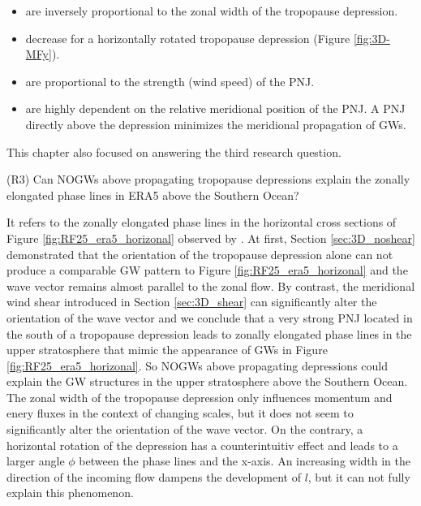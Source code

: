\begin{itemize}
    \item are inversely proportional to the zonal width of the tropopause depression.
    \item decrease for a horizontally rotated tropopause depression (Figure \ref{fig:3D-MFy}).
    \item are proportional to the strength (wind speed) of the PNJ.
    \item are highly dependent on the relative meridional position of the PNJ. A PNJ directly above the depression minimizes the meridional propagation of GWs.
\end{itemize}
This chapter also focused on answering the third research question.
\begin{tcolorbox}[]
    (R3) Can NOGWs above propagating tropopause depressions explain the zonally elongated phase lines in ERA5 above the Southern Ocean?
\end{tcolorbox}
It refers to the zonally elongated phase lines in the horizontal cross sections of Figure \ref{fig:RF25_era5_horizonal} observed by \textcite[]{dornbrack_stratospheric_2022}. At first, Section \ref{sec:3D_noshear} demonstrated that the orientation of the tropopause depression alone can not produce a comparable GW pattern to Figure \ref{fig:RF25_era5_horizonal} and the wave vector remains almost parallel to the zonal flow. By contrast, the meridional wind shear introduced in Section \ref{sec:3D_shear} can significantly alter the orientation of the wave vector and we conclude that a very strong PNJ located in the south of a tropopause depression leads to zonally elongated phase lines in the upper stratosphere that mimic the appearance of GWs in Figure \ref{fig:RF25_era5_horizonal}. So NOGWs above propagating depressions could explain the GW structures in the upper stratosphere above the Southern Ocean. \\
The zonal width of the tropopause depression only influences momentum and enery fluxes in the context of changing scales, but it does not seem to significantly alter the orientation of the wave vector. On the contrary, a horizontal rotation of the depression has a counterintuitiv effect and leads to a larger angle $\phi$ between the phase lines and the x-axis. An increasing width in the direction of the incoming flow dampens the development of $l$, but it can not fully explain this phenomenon.   

